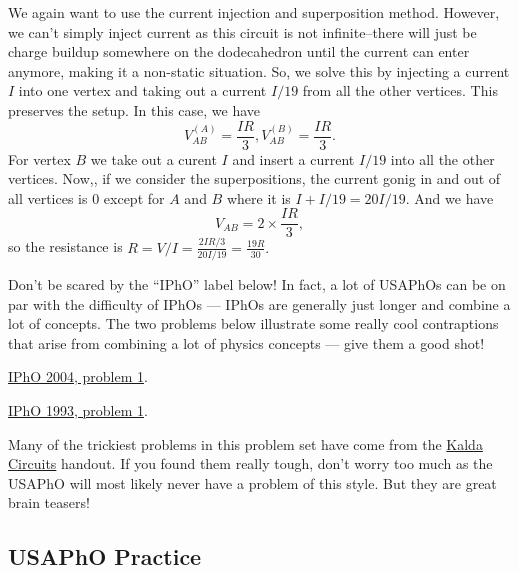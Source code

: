 \documentclass[11pt]{scrartcl}
\begin{document}
\begin{sol}
    We again want to use the current injection and superposition method. However, we can't simply inject current as this circuit is not infinite--there will just be charge buildup somewhere on the dodecahedron until the current can enter anymore, making it a non-static situation. So, we solve this by injecting a current $I$ into one vertex and taking out a current $I/19$ from all the other vertices. This preserves the setup. In this case, we have
    $$V_{AB}^(A) = \frac{IR}{3}, V_{AB}^(B) = \frac{IR}{3}.$$
    For vertex $B$ we take out a curent $I$ and insert a current $I/19$ into all the other vertices. Now,, if we consider the superpositions, the current gonig in and out of all vertices is $0$ except for $A$ and $B$ where it is $I + I/19 = 20I/19$. And we have
    $$V_{AB} = 2\times \frac{IR}{3},$$
    so the resistance is $R = V/I = \frac{2IR/3}{20I/19} = \frac{19R}{30}.$
\end{sol}

\begin{remark}
    Don't be scared by the ``IPhO'' label below! In fact, a lot of USAPhOs can be on par with the difficulty of IPhOs --- IPhOs are generally just longer and combine a lot of concepts. The two problems below illustrate some really cool contraptions that arise from combining a lot of physics concepts --- give them a good shot!
\end{remark}

\begin{prob}
    \href{https://ipho.olimpicos.net/pdf/IPhO_2004_Q1.pdf}{IPhO 2004, problem 1}.
\end{prob}

\begin{prob}
    \href{https://ipho.olimpicos.net/pdf/IPhO_1993_Q1.pdf}{IPhO 1993, problem 1}. 
\end{prob}


\begin{remark}
    Many of the trickiest problems in this problem set have come from the \href{https://www.ioc.ee/~kalda/ipho/electricity-circuits.pdf}{Kalda Circuits} handout. If you found them really tough, don't worry too much as the USAPhO will most likely never have a problem of this style. But they are great brain teasers!
\end{remark}

\subsection{USAPhO Practice}
\end{document}
